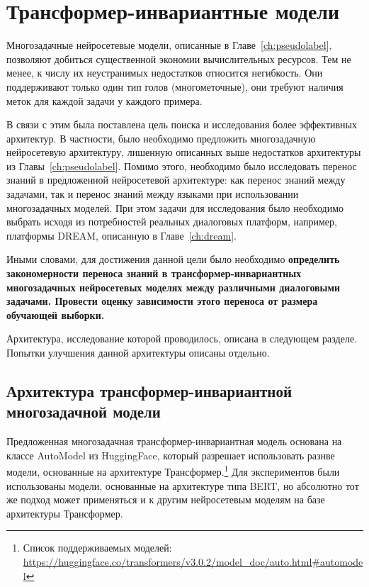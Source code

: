 \chapter{Трансформер-инвариантные модели}\label{ch:tr-ag}
Многозадачные нейросетевые модели, описанные в Главе~\ref{ch:pseudolabel}, позволяют добиться существенной экономии вычислительных ресурсов. Тем не менее, к числу их неустранимых недостатков относится негибкость. Они поддерживают только один тип голов (многометочные), они требуют наличия меток для каждой задачи у каждого примера.

В связи с этим была поставлена цель поиска и исследования более эффективных архитектур. В частности, было необходимо предложить многозадачную нейросетевую архитектуру, лишенную описанных выше недостатков архитектуры из Главы~\ref{ch:pseudolabel}. Помимо этого, необходимо было исследовать перенос знаний в предложенной нейросетевой архитектуре: как перенос знаний между задачами, так и перенос знаний между языками при использовании многозадачных моделей. При этом задачи для исследования было необходимо выбрать исходя из потребностей реальных диалоговых платформ, например, платформы DREAM, описанную в Главе~\ref{ch:dream}. 

Иными словами, для достижения данной цели было необходимо \textbf{определить закономерности переноса знаний в трансформер-инвариантных многозадачных нейросетевых моделях между различными диалоговыми задачами. Провести оценку зависимости этого переноса от размера обучающей выборки.}


Архитектура, исследование которой проводилось, описана в следующем разделе. Попытки улучшения данной архитектуры описаны отдельно. 

\section{Архитектура трансформер-инвариантной многозадачной модели}\label{ch:tr-ag:architecture}
Предложенная многозадачная трансформер-инвариантная модель основана на классе {AutoModel} из HuggingFace, который разрешает использовать разнве модели, основанные на архитектуре Трансформер.\footnote{Список поддерживаемых моделей: \url{https://huggingface.co/transformers/v3.0.2/model_doc/auto.html\#automodel}} Для экспериментов были использованы модели, основанные на архитектуре типа BERT, но абсолютно тот же подход может применяться и к другим нейросетевым моделям на базе архитектуры Трансформер.

